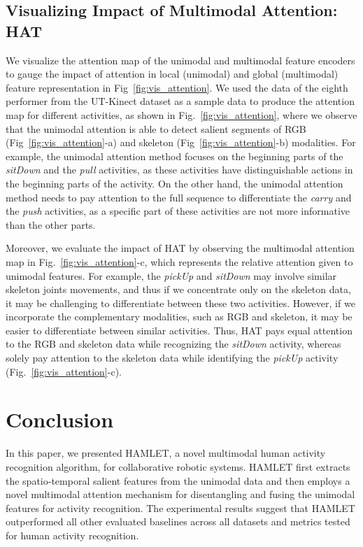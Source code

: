 \documentclass[runningheads]{llncs}
\newcommand{\pa}{HAMLET}
\newcommand{\hattn}{HAT}
\begin{document}
\subsection{Visualizing Impact of Multimodal Attention: \hattn}
\label{sec:attention_vis}

We visualize the attention map of the unimodal and multimodal feature encoders to gauge the impact of attention in local (unimodal) and global (multimodal) feature representation in Fig~\ref{fig:vis_attention}. We used the data of the eighth performer from the UT-Kinect dataset \cite{ut_kinect} as a sample data to produce the attention map for different activities, as shown in Fig.~\ref{fig:vis_attention}, where we observe that the unimodal attention is able to detect salient segments of RGB (Fig~\ref{fig:vis_attention}-a) and skeleton (Fig~\ref{fig:vis_attention}-b) modalities. For example, the unimodal attention method focuses on the beginning parts of the \textit{sitDown} and the \textit{pull} activities, as these activities have distinguishable actions in the beginning parts of the activity. On the other hand, the unimodal attention method needs to pay attention to the full sequence to differentiate the \textit{carry} and the \textit{push} activities, as a specific part of these activities are not more informative than the other parts.

\par Moreover, we evaluate the impact of {\hattn } by observing the multimodal attention map in Fig.~\ref{fig:vis_attention}-c, which represents the relative attention given to unimodal features. For example, the \textit{pickUp} and \textit{sitDown} may involve similar skeleton joints movements, and thus if we concentrate only on the skeleton data, it may be challenging to differentiate between these two activities. However, if we incorporate the complementary modalities, such as RGB and skeleton, it may be easier to differentiate between similar activities. Thus, {\hattn} pays equal attention to the RGB and skeleton data while recognizing the \textit{sitDown} activity, whereas solely pay attention to the skeleton data while identifying the \textit{pickUp} activity (Fig.~\ref{fig:vis_attention}-c).  

 \section{Conclusion}
\label{sec:conclusion}



In this paper, we presented {\pa }, a novel multimodal human activity recognition algorithm, for collaborative robotic systems. 
{\pa } first extracts the spatio-temporal salient features from the unimodal data and then employs a novel multimodal attention mechanism for disentangling and fusing the unimodal features for activity recognition. The experimental results suggest that {\pa } outperformed all other evaluated baselines across all datasets and metrics tested for human activity recognition.
\end{document}
